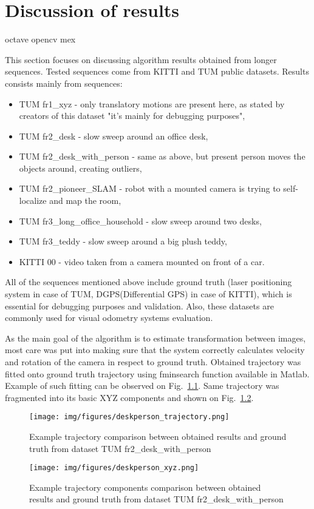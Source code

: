 \chapter{Discussion of results}
octave opencv mex

This section focuses on discussing algorithm results obtained from longer sequences. Tested sequences come from KITTI and TUM public datasets. Results consists mainly from sequences:
\begin{itemize}
	\item TUM fr1\_xyz - only translatory motions are present here, as stated by creators of this dataset "it's mainly for debugging purposes",
	\item TUM fr2\_desk - slow sweep around an office desk,
	\item TUM fr2\_desk\_with\_person - same as above, but present person moves the objects around, creating outliers,
	\item TUM fr2\_pioneer\_SLAM - robot with a mounted camera is trying to self-localize and map the room,
	\item TUM fr3\_long\_office\_household - slow sweep around two desks,
	\item TUM fr3\_teddy - slow sweep around a big plush teddy,
	\item KITTI 00 - video taken from a camera mounted on front of a car.
\end{itemize}

All of the sequences mentioned above include ground truth (laser positioning system in case of TUM, DGPS(Differential GPS) in case of KITTI), which is essential for debugging purposes and validation. Also, these datasets are commonly used for visual odometry systems evaluation.

As the main goal of the algorithm is to estimate transformation between images, most care was put into making sure that the system correctly calculates velocity and rotation of the camera in respect to ground truth. Obtained trajectory was fitted onto ground truth trajectory using fminsearch function available in Matlab. Example of such fitting can be observed on Fig.~\ref{fig:traject}. Same trajectory was fragmented into its basic XYZ components and shown on Fig.~\ref{fig:trajectxyz}.

\begin{figure}[ht]
	\centering\texttt{[image: img/figures/deskperson\_trajectory.png]}
	\caption{ Example trajectory comparison between obtained results and ground truth from dataset TUM fr2\_desk\_with\_person }
	\label{fig:traject}
\end{figure}
\begin{figure}[ht]
	\centering\texttt{[image: img/figures/deskperson\_xyz.png]}
	\caption{ Example trajectory components comparison between obtained results and ground truth from dataset TUM fr2\_desk\_with\_person }
	\label{fig:trajectxyz}
\end{figure}

